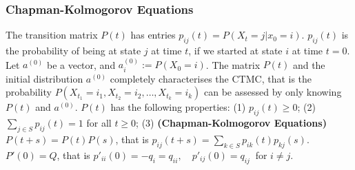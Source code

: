 \subsubsection*{Chapman-Kolmogorov Equations}
 The transition matrix $P(t)$ has entries 
$p_{ij}(t) = P(X_t = j | x_0 = i).$  
$p_{ij}(t)$ is the probability of being at state $j$ at time $t$, if we started at state $i$ at time $t=0$.
 Let $a^{(0)}$ be a vector, and $a^{(0)}_i := P(X_0 = i)$.
 The matrix $P(t)$ and the initial distribution $a^{(0)}$ completely characterises the CTMC, that is the probability 
$P(X_{t_1} = i_1, X_{t_2} = i_2, \ldots, X_{t_k} = i_k)$
can be assessed by only knowing $P(t)$ and $a^{(0)}$.
 $P(t)$ has the following properties:
(1) $p_{ij}(t) \ge 0$;
(2) $\sum_{j \in S}p_{ij}(t) = 1$ for all $t \ge 0$;
(3) \textbf{(Chapman-Kolmogorov Equations)} 
$P(t + s) = P(t)P(s)$, that is $p_{ij}(t+s) = \sum_{k \in S} p_{ik}(t) p_{kj}(s).$
 $P'(0) = Q$, that is 
$p'_{ii}(0) = -q_i = q_{ii}, \quad p'_{ij}(0) = q_{ij}\ $ for $i \ne j.$
